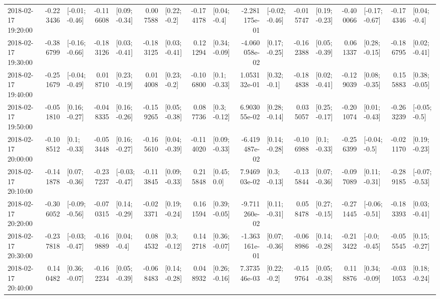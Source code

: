 \begin{tabular}{lrlrlrlrlrlrlrlrl}
2018-02-17 19:20:00 & -0.223436 &  [-0.01; -0.46] & -0.116608 &   [0.09; -0.34] &  0.007588 &    [0.22; -0.2] & -0.174178 &    [0.04; -0.4] & -2.281175e-01 &  [-0.02; -0.46] & -0.015747 &   [0.19; -0.23] & -0.400066 &  [-0.17; -0.67] & -0.174346 &    [0.04; -0.4] \\
2018-02-17 19:30:00 & -0.386799 &  [-0.16; -0.66] & -0.183126 &   [0.03; -0.41] & -0.183125 &   [0.03; -0.41] &  0.121294 &   [0.34; -0.09] & -4.060058e-02 &   [0.17; -0.25] & -0.162388 &   [0.05; -0.39] &  0.061337 &   [0.28; -0.15] & -0.186795 &   [0.02; -0.41] \\
2018-02-17 19:40:00 & -0.251679 &  [-0.04; -0.49] &  0.018710 &   [0.23; -0.19] &  0.014008 &    [0.23; -0.2] & -0.106800 &    [0.1; -0.33] &  1.053132e-01 &    [0.32; -0.1] & -0.184838 &   [0.02; -0.41] & -0.129039 &   [0.08; -0.35] &  0.155883 &   [0.38; -0.05] \\
2018-02-17 19:50:00 & -0.051810 &   [0.16; -0.27] & -0.048335 &   [0.16; -0.26] & -0.159265 &   [0.05; -0.38] &  0.087736 &    [0.3; -0.12] &  6.903055e-02 &   [0.28; -0.14] &  0.035057 &   [0.25; -0.17] & -0.201074 &   [0.01; -0.43] & -0.263239 &   [-0.05; -0.5] \\
2018-02-17 20:00:00 & -0.108512 &    [0.1; -0.33] & -0.053448 &   [0.16; -0.27] & -0.165610 &   [0.04; -0.39] & -0.114020 &   [0.09; -0.33] & -6.419487e-02 &   [0.14; -0.28] & -0.106988 &    [0.1; -0.33] & -0.256399 &   [-0.04; -0.5] & -0.021170 &   [0.19; -0.23] \\
2018-02-17 20:10:00 & -0.141878 &   [0.07; -0.36] & -0.237237 &  [-0.03; -0.47] & -0.113845 &   [0.09; -0.33] &  0.215848 &     [0.45; 0.0] &  7.946903e-02 &    [0.3; -0.13] & -0.135844 &   [0.07; -0.36] & -0.097089 &   [0.11; -0.31] & -0.289185 &  [-0.07; -0.53] \\
2018-02-17 20:20:00 & -0.306052 &  [-0.09; -0.56] & -0.070315 &   [0.14; -0.29] & -0.023371 &   [0.19; -0.24] &  0.161594 &   [0.39; -0.05] & -9.711260e-02 &   [0.11; -0.31] &  0.058478 &   [0.27; -0.15] & -0.271445 &  [-0.06; -0.51] & -0.183393 &   [0.03; -0.41] \\
2018-02-17 20:30:00 & -0.237818 &  [-0.03; -0.47] & -0.169889 &    [0.04; -0.4] &  0.084532 &    [0.3; -0.12] &  0.142718 &   [0.36; -0.07] & -1.363161e-01 &   [0.07; -0.36] & -0.068986 &   [0.14; -0.28] & -0.213422 &   [-0.0; -0.45] & -0.055545 &   [0.15; -0.27] \\
2018-02-17 20:40:00 &  0.140482 &   [0.36; -0.07] & -0.162234 &   [0.05; -0.39] & -0.068483 &   [0.14; -0.28] &  0.048932 &   [0.26; -0.16] &  7.373546e-03 &    [0.22; -0.2] & -0.159764 &   [0.05; -0.38] &  0.118876 &   [0.34; -0.09] & -0.031053 &   [0.18; -0.24] \\

\end{tabular}
